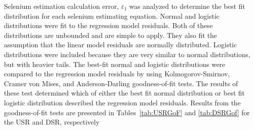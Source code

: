 \begin{linenumbers}
Selenium estimation calculation error, $\varepsilon_{1}$ was analyzed to determine the best fit distribution for each selenium estimating equation.  Normal and logistic distributions were fit to the regression model residuals.  Both of these distributions are unbounded and are simple to apply.  They also fit the assumption that the linear model residuals are normally distributed.  Logistic distributions were included because they are very similar to normal distributions, but with heavier tails.  The best-fit normal and logistic distributions were compared to the regression model residuals by using Kolmogorov-Smirnov, Cramer von Mises, and Anderson-Darling goodness-of-fit tests.  The results of these test determined which of either the best fit normal distribution or best fit logistic distribution described the regression model residuals.  Results from the goodness-of-fit tests are presented in Tables~\ref{tab:USRGoF} and \ref{tab:DSRGof} for the USR and DSR, respectively



\end{linenumbers}
